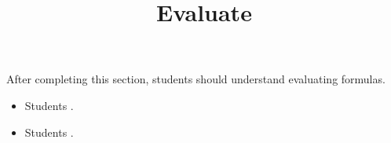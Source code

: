 \documentclass{ximera}
\title{Evaluate}
\begin{document}
\begin{abstract}
\end{abstract}

\maketitle

\begin{sectionOutcomes}

After completing this section, students should understand evaluating formulas. 

\begin{itemize}
\item Students .
\item Students .
\end{itemize}

\end{sectionOutcomes}
\end{document}
